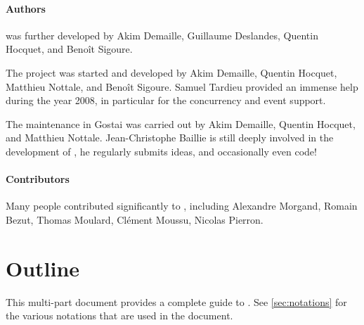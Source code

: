 \paragraph{Authors}
 was further developed by Akim Demaille, Guillaume Deslandes, Quentin
Hocquet, and Benoît Sigoure.

The  project was started and developed by Akim Demaille, Quentin
Hocquet, Matthieu Nottale, and Benoît Sigoure.  Samuel Tardieu provided an
immense help during the year 2008, in particular for the concurrency and
event support.

The maintenance in Gostai was carried out by Akim Demaille, Quentin Hocquet,
and Matthieu Nottale.  Jean-Christophe Baillie is still deeply involved in
the development of \us, he regularly submits ideas, and occasionally even
code!

\paragraph{Contributors}

Many people contributed significantly to \urbi, including Alexandre Morgand,
Romain Bezut, Thomas Moulard, Clément Moussu, Nicolas Pierron.

\section{Outline}

This multi-part document provides a complete guide to \urbi.  See
\autoref{sec:notations} for the various notations that are used in the
document.

\newenvironment{partDescription}[2]
{%
  \item[\autoref{#1} --- \nameref{#1}]~\\%
  #2
  \begin{description}%
    \let\itemOrig\item%
    \renewcommand{\item}[1][]{\itemOrig[~~\autoref{##1} --- \nameref{##1}]~\\}%
  }{%
  \end{description}%
}

\begin{description}





\end{description}


